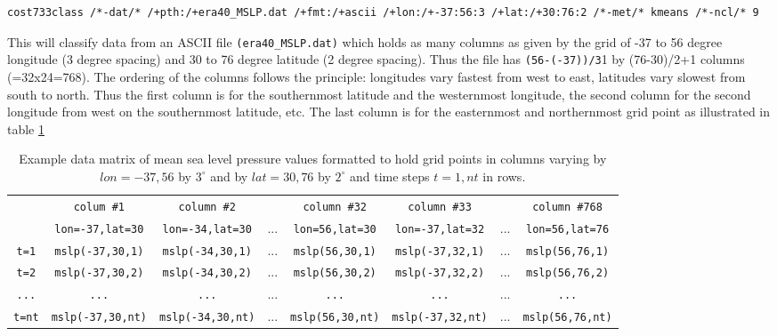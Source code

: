 \documentclass[12pt, oneside, a4paper, headsepline, plainheadsepline]{scrbook}
\begin{document}
\begin{lstlisting}
cost733class /*-dat/* /+pth:/+era40_MSLP.dat /+fmt:/+ascii /+lon:/+-37:56:3 /+lat:/+30:76:2 /*-met/* kmeans /*-ncl/* 9
\end{lstlisting}
This will classify data from an ASCII file \verb+(era40_MSLP.dat)+ which holds as many columns as
given by the grid of -37 to 56 degree longitude (3 degree spacing) and 30 to 76 degree latitude
(2 degree spacing). Thus the file has \verb+(56-(-37))/3+1 by (76-30)/2+1 columns (=32x24=768).
The ordering of the columns follows the principle: longitudes vary fastest from west to east,
latitudes vary slowest from south to north. Thus the first column is for the southernmost latitude 
and the westernmost longitude, the second column for the second longitude from west on the southernmost 
latitude, etc. The last column is for the easternmost and northernmost grid point as illustrated in table \ref{asciidatamatrix}
\begin{table}
\label{asciidatamatrix} 
\begin{scriptsize}
\begin{tabular}{|c|c|c|c|c|c|c|c|}
\hline 
  \verb+ +   & \verb+colum #1+          & \verb+column #2+         &     & \verb+column #32+       & \verb+column #33+        &     & \verb+column #768+ \\ 
  \verb+ +   & \verb+lon=-37,lat=30+    & \verb+lon=-34,lat=30+    & ... & \verb+lon=56,lat=30+    & \verb+lon=-37,lat=32+    & ... & \verb+lon=56,lat=76+ \\ 
\hline 
  \verb+t=1+ &  \verb+mslp(-37,30,1)+    &  \verb+mslp(-34,30,1)+    & ... & \verb+mslp(56,30,1)+    &  \verb+mslp(-37,32,1)+    & ... &   \verb+mslp(56,76,1)+ \\
\hline 
  \verb+t=2+ &  \verb+mslp(-37,30,2)+    &  \verb+mslp(-34,30,2)+    & ... & \verb+mslp(56,30,2)+    &  \verb+mslp(-37,32,2)+    & ... &   \verb+mslp(56,76,2)+ \\
\hline
  \verb+...+  &      \verb+...+         &    \verb+...+            & ... &  \verb+...+             &    \verb+...+            & ... &    \verb+...+          \\
\hline
  \verb+t=nt+ & \verb+mslp(-37,30,nt)+    &  \verb+mslp(-34,30,nt)+    & ... & \verb+mslp(56,30,nt)+    &  \verb+mslp(-37,32,nt)+    & ... &   \verb+mslp(56,76,nt)+ \\
\hline
\end{tabular} 
\end{scriptsize}
\caption{Example data matrix of mean sea level pressure values formatted to hold grid points in columns varying by $lon=-37,56$  by  $3^\circ$ and by $lat=30,76$  by  $2^\circ$ and time steps $t=1,nt$ in rows.}
\end{table}
\end{document}
